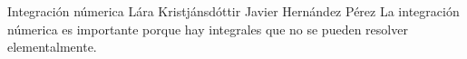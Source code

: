 \documentclass[spanish,a4paper,11pt]{article}
\begin{document}
Integración númerica
Lára Kristjánsdóttir
Javier Hernández Pérez
La integración númerica es importante porque hay integrales que no se pueden resolver elementalmente.\\
\end{document}
